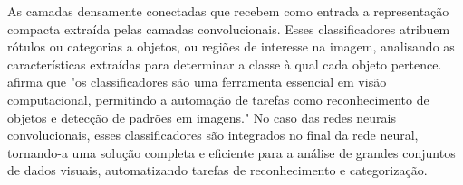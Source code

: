 As camadas densamente conectadas que recebem como entrada a representação compacta extraída pelas camadas convolucionais. Esses classificadores atribuem rótulos ou categorias a objetos, ou regiões de interesse na imagem, analisando as características extraídas para determinar a classe à qual cada objeto pertence. \cite{szeliski} afirma que "os classificadores são uma ferramenta essencial em visão computacional, permitindo a automação de tarefas como reconhecimento de objetos e detecção de padrões em imagens." No caso das redes neurais convolucionais, esses classificadores são integrados no final da rede neural, tornando-a uma solução completa e eficiente para a análise de grandes conjuntos de dados visuais, automatizando tarefas de reconhecimento e categorização.
